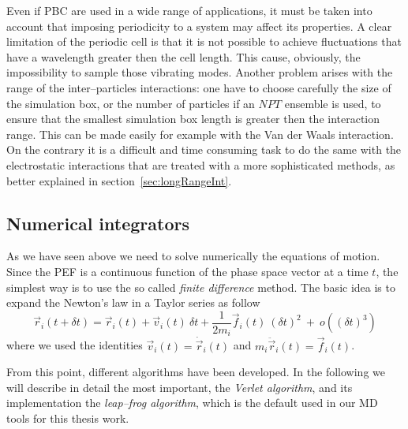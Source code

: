 Even if \ac{PBC} are used in a wide range of applications, it must be taken into account that imposing 
periodicity to a system may affect its properties. A clear limitation of the periodic cell is that it is not 
possible to achieve fluctuations that have a wavelength greater then the cell length. This cause, obviously, the 
impossibility to sample those vibrating modes. Another problem arises with the range of the inter--particles 
interactions: one have to choose carefully the size of the simulation box, or the number of particles if an $NPT$ 
ensemble is used, to ensure that the smallest simulation box length is greater then the interaction range. This 
can be made easily for example with the Van der Waals interaction. On the contrary it is a difficult and time 
consuming task to do the same with the electrostatic interactions that are treated with a more sophisticated 
methods, as better explained in section~\ref{sec:longRangeInt}.

\subsection{Numerical integrators}
As we have seen above we need to solve numerically the equations of motion. Since the \ac{PEF} is a continuous 
function of the phase space vector at a time $t$, the simplest way is to use the so called \textit{finite 
difference} method. The basic idea is to expand the Newton's law in a Taylor series as follow
\begin{equation}
	\vec r_i(t + \delta t) = \vec r_i(t) + \vec v_i(t)\ \delta t + \frac{1}{2m_i}\vec f_i(t)\ (\delta t)^2\ +\ o((\delta t)^3)
	\label{eq:newtonTaylor}
\end{equation}
where we used the identities $\vec v_i(t) = \dot{\vec r}_i(t)$ and $m_i\ddot{\vec r}_i(t) = \vec f_i(t)$.

From this point, different algorithms have been developed. In the following we will describe in detail the most 
important, the \textit{Verlet algorithm}, and its implementation the \textit{leap--frog algorithm}, which is the 
default used in our \ac{MD} tools for this thesis work.

